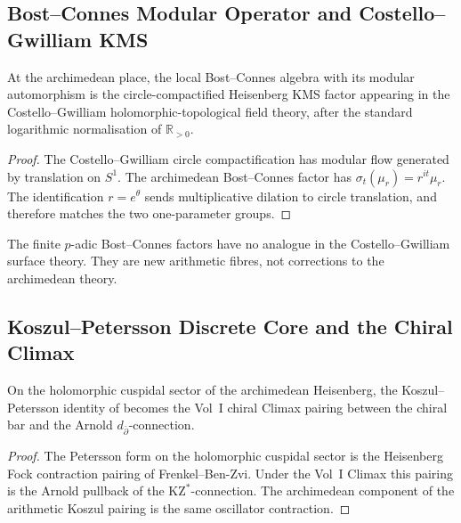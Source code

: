 \subsection{Bost--Connes Modular Operator and Costello--Gwilliam KMS}
\label{v4-arith:w6-i:W5-B-alignment}

\begin{theorem}
\label{v4-arith:w6-i:thm:W5-B-alignment}
At the archimedean place, the local Bost--Connes algebra with its
modular automorphism is the circle-compactified Heisenberg KMS
factor appearing in the Costello--Gwilliam holomorphic-topological
field theory, after the standard logarithmic normalisation of
\(\mathbb R_{>0}\).
\end{theorem}

\begin{proof}
The Costello--Gwilliam circle compactification has modular flow
generated by translation on \(S^1\).  The archimedean Bost--Connes
factor has \(\sigma_t(\mu_r)=r^{it}\mu_r\).  The identification
\(r=e^\theta\) sends multiplicative dilation to circle translation,
and therefore matches the two one-parameter groups.
\end{proof}

\begin{remark}
\label{v4-arith:w6-i:rem:W5-B-finite-extension}
The finite \(p\)-adic Bost--Connes factors have no analogue in the
Costello--Gwilliam surface theory.  They are new arithmetic fibres,
not corrections to the archimedean theory.
\end{remark}

\subsection{Koszul--Petersson Discrete Core and the Chiral Climax}
\label{v4-arith:w6-i:W5-C-alignment}

\begin{theorem}
\label{v4-arith:w6-i:thm:W5-C-alignment}
On the holomorphic cuspidal sector of the archimedean Heisenberg, the
Koszul--Petersson identity of
 becomes the Vol~I chiral
Climax pairing between the chiral bar and the Arnold
\(d_{\bar\partial}\)-connection.
\end{theorem}

\begin{proof}
The Petersson form on the holomorphic cuspidal sector is the
Heisenberg Fock contraction pairing of Frenkel--Ben-Zvi.  Under the
Vol~I Climax this pairing is the Arnold pullback of the
\(\mathrm{KZ}^{*}\)-connection.  The archimedean component of the
arithmetic Koszul pairing is the same oscillator contraction.
\end{proof}

